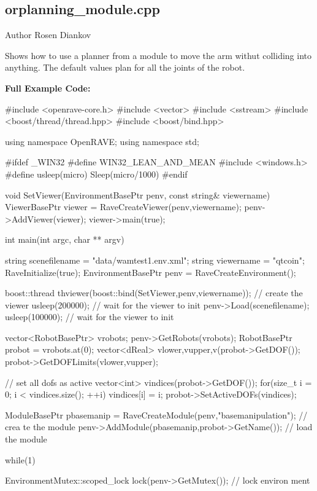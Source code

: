 \hypertarget{orplanning__module.cpp-example}{
\subsection{orplanning\_\-module.cpp}
}
\begin{DoxyAuthor}{Author}
Rosen Diankov
\end{DoxyAuthor}
Shows how to use a planner from a module to move the arm withut colliding into anything. The default values plan for all the joints of the robot.

{\bfseries Full Example Code:}


\begin{DoxyCodeInclude}

#include <openrave-core.h>
#include <vector>
#include <sstream>
#include <boost/thread/thread.hpp>
#include <boost/bind.hpp>

using namespace OpenRAVE;
using namespace std;

#ifdef _WIN32
#define WIN32_LEAN_AND_MEAN
#include <windows.h>
#define usleep(micro) Sleep(micro/1000)
#endif

void SetViewer(EnvironmentBasePtr penv, const string& viewername)
{
    ViewerBasePtr viewer = RaveCreateViewer(penv,viewername);
    penv->AddViewer(viewer);
    viewer->main(true);
}

int main(int argc, char ** argv)
{
    string scenefilename = "data/wamtest1.env.xml";
    string viewername = "qtcoin";
    RaveInitialize(true);
    EnvironmentBasePtr penv = RaveCreateEnvironment();

    boost::thread thviewer(boost::bind(SetViewer,penv,viewername)); // create the
       viewer
    usleep(200000); // wait for the viewer to init
    penv->Load(scenefilename);
    usleep(100000); // wait for the viewer to init

    vector<RobotBasePtr> vrobots;
    penv->GetRobots(vrobots);
    RobotBasePtr probot = vrobots.at(0);
    vector<dReal> vlower,vupper,v(probot->GetDOF());
    probot->GetDOFLimits(vlower,vupper);

    // set all dofs as active
    vector<int> vindices(probot->GetDOF());
    for(size_t i = 0; i < vindices.size(); ++i) {
        vindices[i] = i;
    }
    probot->SetActiveDOFs(vindices);

    ModuleBasePtr pbasemanip = RaveCreateModule(penv,"basemanipulation"); // crea
      te the module
    penv->AddModule(pbasemanip,probot->GetName()); // load the module

    while(1) {
        {
            EnvironmentMutex::scoped_lock lock(penv->GetMutex()); // lock environ
      ment

}}}
\end{DoxyCodeInclude}
